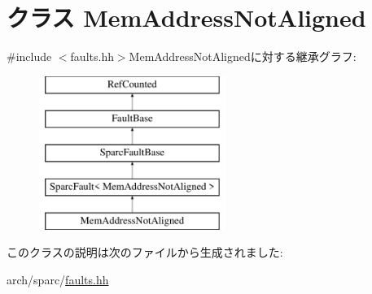 \hypertarget{classSparcISA_1_1MemAddressNotAligned}{
\section{クラス MemAddressNotAligned}
\label{classSparcISA_1_1MemAddressNotAligned}
}


{\ttfamily \#include $<$faults.hh$>$}MemAddressNotAlignedに対する継承グラフ:\begin{figure}[H]
\begin{center}
\leavevmode
\includegraphics[height=5cm]{classSparcISA_1_1MemAddressNotAligned}
\end{center}
\end{figure}


このクラスの説明は次のファイルから生成されました:\begin{DoxyCompactItemize}
\item 
arch/sparc/\hyperlink{arch_2sparc_2faults_8hh}{faults.hh}\end{DoxyCompactItemize}
